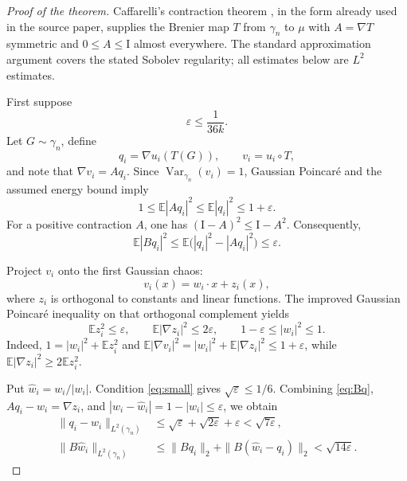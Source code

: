 \documentclass[11pt]{article}
\newcommand{\E}{\mathbb E}
\newcommand{\Var}{\operatorname{Var}}
\newcommand{\Id}{\mathrm I}
\begin{document}
\begin{proof}[Proof of the theorem]
Caffarelli's contraction theorem \cite{Caffarelli}, in the form already used
in the source paper, supplies the Brenier map $T$ from $\gamma_n$ to $\mu$
with $A=\nabla T$ symmetric and $0\le A\le\Id$ almost everywhere.  The
standard approximation argument covers the stated Sobolev regularity; all
estimates below are $L^2$ estimates.

First suppose
\begin{equation}\label{eq:small}
 \varepsilon\le\frac1{36k}.
\end{equation}
Let $G\sim\gamma_n$, define
\[
 q_i=\nabla u_i(T(G)),\qquad v_i=u_i\circ T,
\]
and note that $\nabla v_i=Aq_i$.  Since $\Var_{\gamma_n}(v_i)=1$, Gaussian
Poincar\'e and the assumed energy bound imply
\[
 1\le\E|Aq_i|^2\le\E|q_i|^2\le1+\varepsilon.
\]
For a positive contraction $A$, one has
$(\Id-A)^2\le\Id-A^2$.  Consequently,
\begin{equation}\label{eq:Bq}
 \E|Bq_i|^2
 \le\E\bigl(|q_i|^2-|Aq_i|^2\bigr)
 \le\varepsilon.
\end{equation}

Project $v_i$ onto the first Gaussian chaos:
\[
 v_i(x)=w_i\cdot x+z_i(x),
\]
where $z_i$ is orthogonal to constants and linear functions.  The improved
Gaussian Poincar\'e inequality on that orthogonal complement yields
\[
 \E z_i^2\le\varepsilon,\qquad
 \E|\nabla z_i|^2\le2\varepsilon,\qquad
 1-\varepsilon\le|w_i|^2\le1.
\]
Indeed, $1=|w_i|^2+\E z_i^2$ and
$\E|\nabla v_i|^2=|w_i|^2+\E|\nabla z_i|^2\le1+\varepsilon$, while
$\E|\nabla z_i|^2\ge2\E z_i^2$.

Put $\widehat w_i=w_i/|w_i|$.  Condition \eqref{eq:small} gives
$\sqrt\varepsilon\le1/6$.  Combining \eqref{eq:Bq},
$Aq_i-w_i=\nabla z_i$, and
$|w_i-\widehat w_i|=1-|w_i|\le\varepsilon$, we obtain
\begin{align}
 \|q_i-\widehat w_i\|_{L^2(\gamma_n)}
 &\le\sqrt\varepsilon+\sqrt{2\varepsilon}+\varepsilon
 <\sqrt{7\varepsilon},\label{eq:qhat}\\
 \|B\widehat w_i\|_{L^2(\gamma_n)}
 &\le\|Bq_i\|_2+\|B(\widehat w_i-q_i)\|_2
 <\sqrt{14\varepsilon}.
 \label{eq:Bhat}
\end{align}


\end{proof}
\end{document}
